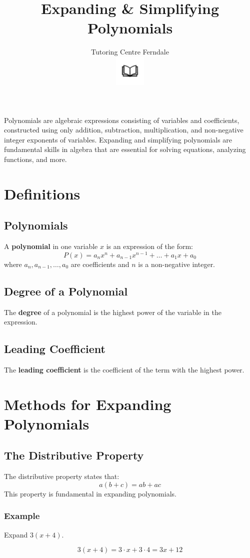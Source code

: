 \documentclass[12pt]{article}
\title{\textbf{Expanding \& Simplifying Polynomials}}
\author{Tutoring Centre Ferndale\\
\includegraphics[width=4em]{ApS_logo.png}}
\date{}
\begin{document}
Polynomials are algebraic expressions consisting of variables and coefficients, constructed using only addition, subtraction, multiplication, and non-negative integer exponents of variables. Expanding and simplifying polynomials are fundamental skills in algebra that are essential for solving equations, analyzing functions, and more.

\section*{Definitions}
\subsection*{Polynomials}
A \textbf{polynomial} in one variable \(x\) is an expression of the form:
\[
P(x) = a_nx^n + a_{n-1}x^{n-1} + \dots + a_1x + a_0
\]
where \(a_n, a_{n-1}, \dots, a_0\) are coefficients and \(n\) is a non-negative integer.

\subsection*{Degree of a Polynomial}
The \textbf{degree} of a polynomial is the highest power of the variable in the expression.

\subsection*{Leading Coefficient}
The \textbf{leading coefficient} is the coefficient of the term with the highest power.

\newpage

\section*{Methods for Expanding Polynomials}
\subsection*{The Distributive Property}
The distributive property states that:
\[
a(b + c) = ab + ac
\]
This property is fundamental in expanding polynomials.

\subsubsection*{Example}
Expand \( 3(x + 4) \).

\[
3(x + 4) = 3 \cdot x + 3 \cdot 4 = 3x + 12
\]
\end{document}
